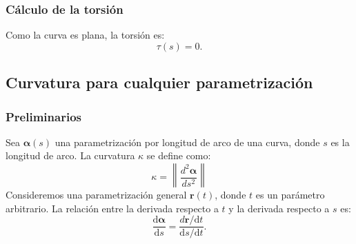 \documentclass[11pt]{book}
\theoremstyle{definicion}
\theoremstyle{teorema}
\theoremstyle{ejemplo}
\begin{document}
\subsubsection{Cálculo de la torsión}
\noindent Como la curva es plana, la torsión es:
\[
\tau(s) = 0.
\]




\subsection{Curvatura para cualquier parametrizaci\'on}

\subsubsection{Preliminarios}

Sea $\boldsymbol{\alpha}(s)$ una parametrización por longitud de arco de una curva, donde $s$ es la longitud de arco. La curvatura $\kappa$ se define como:
\begin{equation*}
\kappa = \left\| \frac{d^2 \boldsymbol{\alpha}}{ds^2} \right\|
\end{equation*}
%
%
Consideremos una parametrización general $\mathbf{r}(t)$, donde $t$ es un parámetro arbitrario. La relación entre la derivada respecto a $t$ y la derivada respecto a $s$ es:
\begin{equation*}
\frac{\mathrm{d}\boldsymbol{\alpha}}{\mathrm{d}s} = \frac{d\mathbf{r}/\mathrm{d}t}{\mathrm{d}s/\mathrm{d}t}.
\end{equation*}
\end{document}
